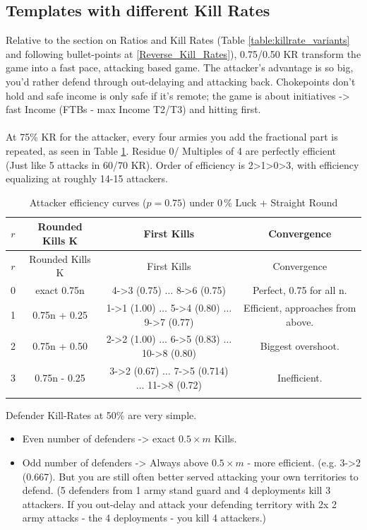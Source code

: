 \subsection{Templates with different Kill Rates}

Relative to the section on Ratios and Kill Rates (Table \ref{table:killrate_variants} and following bullet-points at \ref{Reverse_Kill_Rates}), 0.75/0.50 KR transform the game into a fast pace, attacking based game. The attacker's advantage is so big, you'd rather defend through out-delaying and attacking back. Chokepoints don't hold and safe income is only safe if it's remote; the game is about initiatives -> fast Income (FTBs - max Income T2/T3) and hitting first.
\\
\\
At 75\% KR for the attacker, every four armies you add the fractional part is repeated, as seen in Table \ref{table:attackerResidue_Timid}. Residue 0/ Multiples of 4 are perfectly efficient (Just like 5 attacks in 60/70 KR). Order of efficiency is 2>1>0>3, with efficiency equalizing at roughly 14-15 attackers. 

\small
\begin{longtable}{|c|c|c|c|}
\hline
\rowcolor{Baby_Blue}
$r$ & Rounded Kills K & First Kills & Convergence \\ 
\hline\hline
\endfirsthead
\hline
\rowcolor{Baby_Blue}
$r$ & Rounded Kills K & First Kills & Convergence \\ 
\hline\hline
\endhead
0 & exact 0.75n & 4->3 (0.75) $\dots$ 8->6 (0.75) & Perfect, 0.75 for all n. \\
1 & 0.75n + 0.25 & 1->1 (1.00) $\dots$ 5->4 (0.80) $\dots$ 9->7 (0.77) & Efficient, approaches from above. \\
2 & 0.75n + 0.50 & 2->2 (1.00) $\dots$ 6->5 (0.83) $\dots$ 10->8 (0.80) & Biggest overshoot. \\
3 & 0.75n - 0.25 & 3->2 (0.67) $\dots$ 7->5 (0.714) $\dots$ 11->8 (0.72) & Inefficient. \\ 
\hline
\caption{Attacker efficiency curves ($p = 0.75$) under 0\,\% Luck + Straight Round}
\label{table:attackerResidue_Timid}
\end{longtable}
\normalsize

Defender Kill-Rates at 50\% are very simple. 
\begin{itemize}
    \item Even number of defenders -> exact $0.5\times m$ Kills.
    \item Odd number of defenders -> Always above $0.5\times m$ - more efficient. (e.g. 3->2 (0.667). But you are still often better served attacking your own territories to defend. (5 defenders from 1 army stand guard and 4 deployments kill 3 attackers. If you out-delay and attack your defending territory with 2x 2 army attacks - the 4 deployments - you kill 4 attackers.)
\end{itemize}